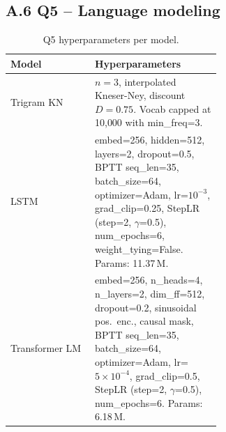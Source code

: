 \documentclass[12pt, a4paper]{article}
\begin{document}
\subsection*{A.6 Q5 -- Language modeling}
\begin{table}[H]
\centering
\caption{Q5 hyperparameters per model.}
\begin{tabular}{lp{0.6\linewidth}}
\toprule
\textbf{Model} & \textbf{Hyperparameters} \\
\midrule
Trigram KN     & $n=3$, interpolated Kneser-Ney, discount $D=0.75$. Vocab capped at 10{,}000 with min\_freq=3. \\
LSTM           & embed=256, hidden=512, layers=2, dropout=0.5, BPTT seq\_len=35, batch\_size=64, optimizer=Adam, lr=$10^{-3}$, grad\_clip=0.25, StepLR (step=2, $\gamma$=0.5), num\_epochs=6, weight\_tying=False. Params: 11.37\,M. \\
Transformer LM & embed=256, n\_heads=4, n\_layers=2, dim\_ff=512, dropout=0.2, sinusoidal pos.\ enc., causal mask, BPTT seq\_len=35, batch\_size=64, optimizer=Adam, lr=$5\!\times\!10^{-4}$, grad\_clip=0.5, StepLR (step=2, $\gamma$=0.5), num\_epochs=6. Params: 6.18\,M. \\
\bottomrule
\end{tabular}
\end{table}
\end{document}
